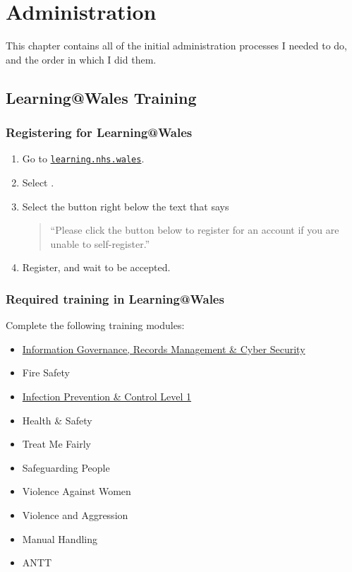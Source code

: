\chapter{Administration}
\label{ch:administration}

This chapter contains all of the initial administration processes I needed to do, and the order in which I did them.



\section{Learning@Wales Training}

\subsection{Registering for Learning@Wales}

\begin{enumerate}
    \item Go to
    \href{https://learning.nhs.wales/}{\texttt{learning.nhs.wales}}.

    \item Select .

    \item Select the button right below the text that says

    \begin{quote}
        \enquote{Please click the button below to register for an
        account if you are unable to self-register.}
    \end{quote}
    \item Register, and wait to be accepted.
\end{enumerate}

\subsection{Required training in Learning@Wales}

Complete the following training modules:

\begin{itemize}
    \item \href{https://learningiomad.nhs.wales/enrol/index.php?id=1693}{Information Governance, Records Management \& Cyber Security}
    \item Fire Safety
    \item \href{https://learningiomad.nhs.wales/mod/scorm/player.php}{Infection Prevention \& Control Level 1}
    \item Health \& Safety
    \item Treat Me Fairly
    \item Safeguarding People
    \item Violence Against Women
    \item Violence and Aggression
    \item Manual Handling
    \item ANTT 
\end{itemize}

